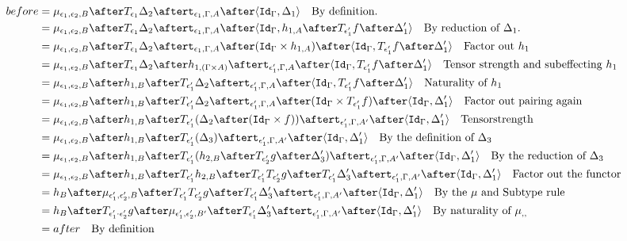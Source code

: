 \documentclass{report}
\begin{document}
            \begin{align}
                before &= \bind{\e_1}{\e_2}{B}\after \T{\e_1}{\D_2}\after\tstrength{\e_1}{\G}{A}\after\pr{\idg}{\D_1}\qt{By definition.}\\
                &= \bind{\e_1}{\e_2}{B}\after \T{\e_1}{\D_2}\after\tstrength{\e_1}{\G}{A}\after\pr{\idg}{h_{1, A}\after\T{\e_1'}{f}\after\D_1'}\qt{By reduction of $\D_1$.}\\
                &= \bind{\e_1}{\e_2}{B}\after \T{\e_1}{\D_2}\after\tstrength{\e_1}{\G}{A}\after(\idg\times h_{1, A})\after\pr{\idg}{\T{\e_1'}{f}\after\D_1'}\qt{Factor out $h_1$}\\
                &= \bind{\e_1}{\e_2}{B}\after \T{\e_1}{\D_2}\after
                h_{1, (\G\times A)}\after
                \tstrength{\e_1'}{\G}{A}\after\pr{\idg}{\T{\e_1'}{f}\after\D_1'}\qt{Tensor strength and subeffecting $h_1$}\\
                &= \bind{\e_1}{\e_2}{B}\after 
                h_{1, B}\after\T{\e_1'}{\D_2}\after
                \tstrength{\e_1'}{\G}{A}\after\pr{\idg}{\T{\e_1'}{f}\after\D_1'}\qt{Naturality of $h_1$}\\
                &= \bind{\e_1}{\e_2}{B}\after 
                h_{1, B}\after\T{\e_1'}{\D_2}\after
                \tstrength{\e_1'}{\G}{A}\after(\idg\times \T{\e_1'}{f})\after\pr{\idg}{\D_1'}\qt{Factor out pairing again}\\
                &= \bind{\e_1}{\e_2}{B}\after 
                h_{1, B}\after\T{\e_1'}{(\D_2\after(\idg\times f))}\after
                \tstrength{\e_1'}{\G}{A'}\after\pr{\idg}{\D_1'}\qt{Tensorstrength}\\
                &= \bind{\e_1}{\e_2}{B}\after 
                h_{1, B}\after\T{\e_1'}{(\D_3)}\after
                \tstrength{\e_1'}{\G}{A'}\after\pr{\idg}{\D_1'}\qt{By the definition of $\D_3$}\\
                &= \bind{\e_1}{\e_2}{B}\after 
                h_{1, B}\after\T{\e_1'}{(h_{2, B}\after\T{\e_2'}{g}\after \D_3')}\after
                \tstrength{\e_1'}{\G}{A'}\after\pr{\idg}{\D_1'}\qt{By the reduction of $\D_3$}\\
                &= \bind{\e_1}{\e_2}{B}\after 
                h_{1, B}\after\T{\e_1'}{h_{2, B}}\after\T{\e_1'}{\T{\e_2'}{g}}\after \T{\e_1'}{\D_3'}\after
                \tstrength{\e_1'}{\G}{A'}\after\pr{\idg}{\D_1'}\qt{Factor out the functor}\\
                &= h_B\after\bind{\e_1'}{\e_2'}{B}\after\T{\e_1'}{\T{\e_2'}{g}}\after \T{\e_1'}{\D_3'}\after
                \tstrength{\e_1'}{\G}{A'}\after\pr{\idg}{\D_1'}\qt{By the $\mu$ and Subtype rule }\\
                & = h_B\after\T{\e_1'\dot\e_2'}{g}\after\bind{\e_1'}{\e_2'}{B'}\after \T{\e_1'}{\D_3'}\after
                \tstrength{\e_1'}{\G}{A'}\after\pr{\idg}{\D_1'}\qt{By naturality of $\bind{}{}{}$ }\\
                & = after \qt{By definition}
            \end{align}
\end{document}
